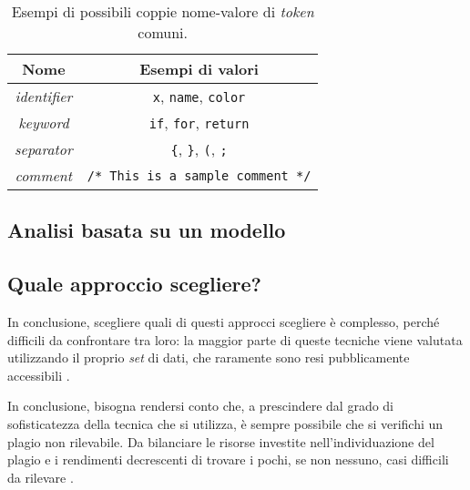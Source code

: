 \begin{table}[h]
    \centering
    \begin{tabular}{|c|c|} 
        \hline
        \textbf{Nome} & \textbf{Esempi di valori} \\ [0.5ex] 
        \hline\hline
        \textit{identifier} & \texttt{x}, \texttt{name}, \texttt{color} \\ 
        \hline
        \textit{keyword} & \texttt{if}, \texttt{for}, \texttt{return} \\
        \hline
        \textit{separator} & \texttt{\{}, \texttt{\}}, \texttt{(}, \texttt{;} \\
        \hline
        \textit{comment} & \texttt{/* This is a sample comment */} \\
        \hline
    \end{tabular}
    \caption{Esempi di possibili coppie nome-valore di \textit{token} comuni.}
\end{table}

\subsection{Analisi basata su un modello}

\subsection{Quale approccio scegliere?}
In conclusione, scegliere quali di questi approcci scegliere è complesso, perché difficili da confrontare tra loro: la maggior parte di queste tecniche viene valutata utilizzando il proprio \textit{set} di dati, che raramente sono resi pubblicamente accessibili \cite{karnalim-budi-toba-joy-2019}.

In conclusione, bisogna rendersi conto che, a prescindere dal grado di sofisticatezza della tecnica che si utilizza, è sempre possibile che si verifichi un plagio non rilevabile.
%
Da bilanciare le risorse investite nell'individuazione del plagio e i rendimenti decrescenti di trovare i pochi, se non nessuno, casi difficili da rilevare \cite{joy-99}.


